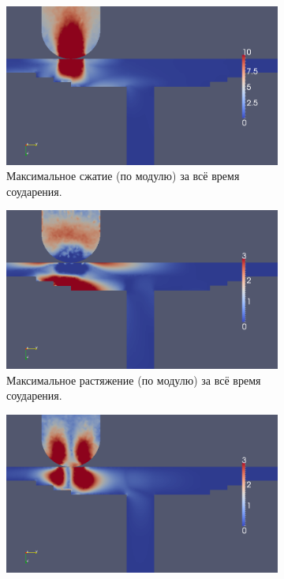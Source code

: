 \clearpage
\newpage

\begin{figure}[h]
\begin{subfigure}[b]{0.5\textwidth}
\centering
\includegraphics[width=\textwidth]{png/pkm-experiment/wing-stringer-non-center/compression.png}
\caption{Максимальное сжатие (по модулю) за всё время соударения.}
\end{subfigure}
\begin{subfigure}[b]{0.5\textwidth}
\centering
\includegraphics[width=\textwidth]{png/pkm-experiment/wing-stringer-non-center/tension.png}
\caption{Максимальное растяжение (по модулю) за всё время соударения.}
\end{subfigure}
\begin{subfigure}[b]{0.5\textwidth}
\centering
\includegraphics[width=\textwidth]{png/pkm-experiment/wing-stringer-non-center/shear.png}

\end{subfigure}
\end{figure}
